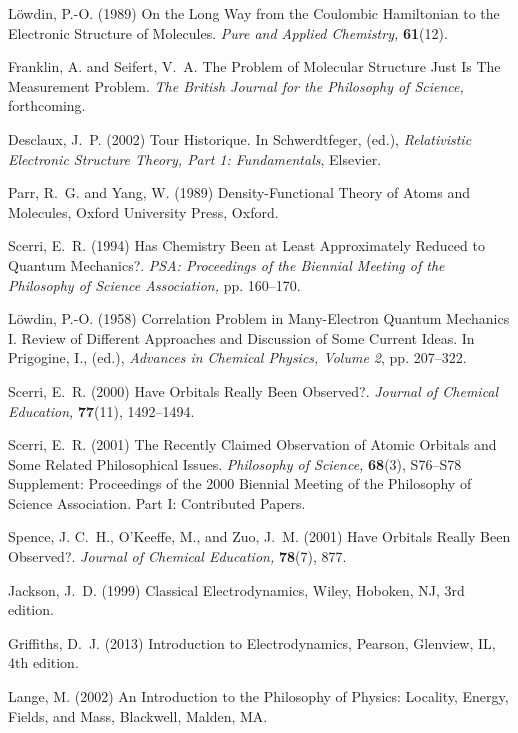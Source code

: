 \documentclass[onecolumn,secnumarabic,amsmath,amssymb,balancelastpage,nofootinbib]{article}
\begin{document}
\begin{thebibliography}{100}
L\"{o}wdin, P.-O. (1989)
On the Long Way from the Coulombic Hamiltonian to the Electronic Structure of
  Molecules.
{\em Pure and Applied Chemistry,} {\bf 61}(12).

Franklin, A. and Seifert, V.~A.
The Problem of Molecular Structure Just Is The Measurement Problem.
{\em The British Journal for the Philosophy of Science,}
forthcoming.

Desclaux, J.~P. (2002)
Tour Historique.
In Schwerdtfeger, (ed.), \emph{Relativistic Electronic Structure Theory, Part
  1: Fundamentals},  Elsevier.

Parr, R.~G. and Yang, W. (1989)
Density-Functional Theory of Atoms and Molecules,
Oxford University Press, Oxford.

Scerri, E.~R. (1994)
Has Chemistry Been at Least Approximately Reduced to Quantum Mechanics?.
{\em PSA: Proceedings of the Biennial Meeting of the Philosophy of Science
  Association,} pp. 160--170.

L\"{o}wdin, P.-O. (1958)
Correlation Problem in Many-Electron Quantum Mechanics I. Review of Different
  Approaches and Discussion of Some Current Ideas.
In Prigogine, I., (ed.), \emph{Advances in Chemical Physics, Volume 2},  pp.
  207--322.

Scerri, E.~R. (2000)
Have Orbitals Really Been Observed?.
{\em Journal of Chemical Education,} {\bf 77}(11), 1492--1494.

Scerri, E.~R. (2001)
The Recently Claimed Observation of Atomic Orbitals and Some Related
  Philosophical Issues.
{\em Philosophy of Science,} {\bf 68}(3), S76--S78
Supplement: Proceedings of the 2000 Biennial Meeting of the Philosophy of
  Science Association. Part I: Contributed Papers.

Spence, J. C.~H., O'Keeffe, M., and Zuo, J.~M. (2001)
Have Orbitals Really Been Observed?.
{\em Journal of Chemical Education,} {\bf 78}(7), 877.

Jackson, J.~D. (1999)
Classical Electrodynamics,
Wiley, Hoboken, NJ, 3rd edition.

Griffiths, D.~J. (2013)
Introduction to Electrodynamics,
Pearson, Glenview, IL, 4th edition.

Lange, M. (2002)
An Introduction to the Philosophy of Physics: Locality, Energy, Fields, and
  Mass,
Blackwell, Malden, MA.


\end{thebibliography}
\end{document}
